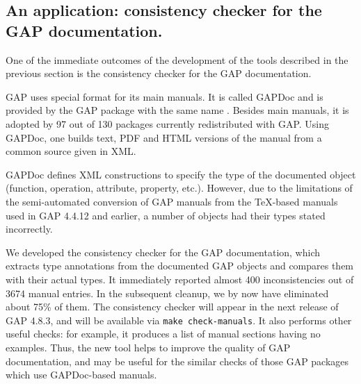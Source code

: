
\subsection{An application: consistency checker for the GAP
  documentation.}\label{gap-types}

One of the immediate outcomes of the development of the tools described in the
previous section is the consistency checker for the GAP documentation. 

GAP uses special format for its main manuals. It is called GAPDoc and is 
provided by the GAP package with the same name \cite{gapdoc}. Besides main 
manuals, it is adopted by 97 out of 130 packages currently redistributed 
with GAP. Using GAPDoc, one builds text, PDF and HTML versions of the manual
from a common source given in XML.

GAPDoc defines XML constructions to specify the type of the documented object 
(function, operation, attribute, property, etc.). However, due to the 
limitations of the semi-automated conversion of GAP manuals from the \TeX-based
manuals used in GAP 4.4.12 and earlier, a number of objects had their types
stated incorrectly. 

We developed the consistency checker for the GAP documentation, which extracts
type annotations from the documented GAP objects and compares them with their
actual types. It immediately reported almost 400 inconsistencies out of 3674 
manual entries. In the subsequent cleanup, we by now have eliminated about 
75\% of them. The  consistency checker will appear in the next release of
GAP 4.8.3, and will be available via \texttt{make check-manuals}.
It also performs other useful checks: for example, it produces a list of
manual sections having no examples. Thus, the new tool helps to improve
the quality of GAP documentation, and may be useful for the similar checks
of those GAP packages which use GAPDoc-based manuals.




